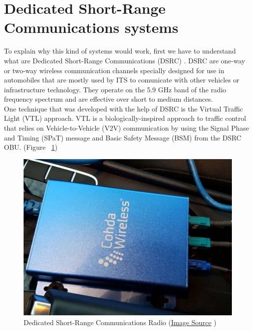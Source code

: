\documentclass[17pt]{report}
\begin{document}
\section{Dedicated Short-Range Communications systems}
\indent \indent
To explain why this kind of systems would work, first we have to understand what
are Dedicated Short-Range Communications (DSRC) \cite{Zhang2018}
\cite{Tomar2022}. DSRC are one-way or two-way wireless communication channels
specially designed for use in automobiles that are mostly used by ITS to
comunicate with other vehicles or infrastructure technology. They operate on
the 5.9 GHz band of the radio frequency spectrum and are effective over short
to medium distances.\\
\indent \indent
One technique that was developed with the help of DSRC is the Virtual Traffic
Light (VTL) approach. VTL is a biologically-inspired approach to traffic
control that relies on Vehicle-to-Vehicle (V2V) communication by using the
Signal Phase and Timing (SPaT) message and Basic Safety Message (BSM) from
the DSRC OBU. (Figure ~\ref{fig:DSRCRadio})
\begin{figure}[h!]
    \includegraphics[width=\textwidth]{DSRCRadio.png}
    \caption{Dedicated Short-Range Communications Radio 
    (\href{https://www.researchgate.net/figure/DSRC-radios-used-in-the-prototype-system_fig1_326198424}{Image Source} \textcopyright)}
    \label{fig:DSRCRadio}
\end{figure}\\
\end{document}
